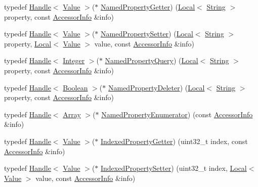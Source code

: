 \begin{DoxyCompactItemize}
\item 
typedef \hyperlink{classv8_1_1_handle}{Handle}$<$ \hyperlink{classv8_1_1_value}{Value} $>$($\ast$ \hyperlink{namespacev8_ab9effde41da1c073eddbd4a11a62bd0b}{Named\+Property\+Getter}) (\hyperlink{classv8_1_1_local}{Local}$<$ \hyperlink{classv8_1_1_string}{String} $>$ property, const \hyperlink{classv8_1_1_accessor_info}{Accessor\+Info} \&info)
\item 
typedef \hyperlink{classv8_1_1_handle}{Handle}$<$ \hyperlink{classv8_1_1_value}{Value} $>$($\ast$ \hyperlink{namespacev8_a682b1fc46feab32605c4905612ffe870}{Named\+Property\+Setter}) (\hyperlink{classv8_1_1_local}{Local}$<$ \hyperlink{classv8_1_1_string}{String} $>$ property, \hyperlink{classv8_1_1_local}{Local}$<$ \hyperlink{classv8_1_1_value}{Value} $>$ value, const \hyperlink{classv8_1_1_accessor_info}{Accessor\+Info} \&info)
\item 
typedef \hyperlink{classv8_1_1_handle}{Handle}$<$ \hyperlink{classv8_1_1_integer}{Integer} $>$($\ast$ \hyperlink{namespacev8_a0136e8102c101d9a39497f75daa9153b}{Named\+Property\+Query}) (\hyperlink{classv8_1_1_local}{Local}$<$ \hyperlink{classv8_1_1_string}{String} $>$ property, const \hyperlink{classv8_1_1_accessor_info}{Accessor\+Info} \&info)
\item 
typedef \hyperlink{classv8_1_1_handle}{Handle}$<$ \hyperlink{classv8_1_1_boolean}{Boolean} $>$($\ast$ \hyperlink{namespacev8_a7899471fae82b252750b81f41d5c1e26}{Named\+Property\+Deleter}) (\hyperlink{classv8_1_1_local}{Local}$<$ \hyperlink{classv8_1_1_string}{String} $>$ property, const \hyperlink{classv8_1_1_accessor_info}{Accessor\+Info} \&info)
\item 
typedef \hyperlink{classv8_1_1_handle}{Handle}$<$ \hyperlink{classv8_1_1_array}{Array} $>$($\ast$ \hyperlink{namespacev8_acbd04b83708cb5a80e73e0396f176e58}{Named\+Property\+Enumerator}) (const \hyperlink{classv8_1_1_accessor_info}{Accessor\+Info} \&info)
\item 
typedef \hyperlink{classv8_1_1_handle}{Handle}$<$ \hyperlink{classv8_1_1_value}{Value} $>$($\ast$ \hyperlink{namespacev8_abf3be19b5157493da3859987cc50c6ab}{Indexed\+Property\+Getter}) (uint32\+\_\+t index, const \hyperlink{classv8_1_1_accessor_info}{Accessor\+Info} \&info)
\item 
typedef \hyperlink{classv8_1_1_handle}{Handle}$<$ \hyperlink{classv8_1_1_value}{Value} $>$($\ast$ \hyperlink{namespacev8_a3ca53e294b9b695b3777af904ca942b6}{Indexed\+Property\+Setter}) (uint32\+\_\+t index, \hyperlink{classv8_1_1_local}{Local}$<$ \hyperlink{classv8_1_1_value}{Value} $>$ value, const \hyperlink{classv8_1_1_accessor_info}{Accessor\+Info} \&info)

\end{DoxyCompactItemize}
